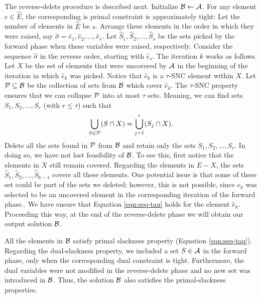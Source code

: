 \documentclass[11pt]{article}
\newcommand{\calA} {{\cal A}}
\newcommand{\calB} {{\cal B}}
\newcommand{\calP} {{\cal P}}
\newcommand{\wh}[1] {\widehat{#1}}
\begin{document}
The reverse-delete procedure is described next.
Initialize $\calB\leftarrow \calA$.
For any element $e\in \wh{E}$, the corresponding is primal constraint is approximately tight:
Let the number of elements in $\wh{E}$ be $s$. Arrange these elements
in the order in which they were raised, say $\wh{\sigma}=\wh{e}_1, \wh{e}_2, \ldots, \wh{e}_s$.
Let $\wh{S}_1, \wh{S}_2, \ldots, \wh{S}_s$ be the sets picked by the forward phase
when these variables were raised, respectively.
Consider the sequence $\wh{\sigma}$ in the reverse order, starting with $\wh{e}_s$.
The iteration $k$ works as follows. 
Let $X$ be the set of elements that were uncovered by $\calA$ in the beginning of the iteration 
in which $\wh{e}_k$ was picked. Notice that $\wh{e}_k$ is a $\tau$-SNC element within $X$.
Let $\calP\subseteq \calB$ be the collection of sets from $\calB$ which cover $\wh{e}_k$. 
The $\tau$-SNC property ensures that we can collapse $\calP$ into at most $\tau$ sets.
Meaning, we can find sets $S_1, S_2, \ldots, S_r$ (with $r\leq \tau$) such that
\[
\bigcup_{S\in \calP} (S\cap X) = \bigcup_{j=1}^r (S_j\cap X).
\]
Delete all the sets found in $\calP$ from $\calB$ and retain only the sets $S_1, S_2, \ldots, S_r$.
In doing so, we have not lost feasibility of $\calB$. To see this, first notice that the elements in $X$ still remain
covered. Regarding the elements in $E-X$, 
the sets $\wh{S}_1, \wh{S}_2, \ldots, \wh{S}_{k-1}$ covers all these elements.
One potential issue is that some of these set could be part of the sets we deleted;
however, this is not possible, since $e_k$ was selected to be an uncovered element in the corresponding iteration
of the forward phase..
We have ensure that Equation \ref{eqn:seq-tau} holds for the element $\wh{e}_k$.
Proceeding this way, at the end of the reverse-delete phase we will obtain our output solution $\calB$.

All the elements in $\calB$ satisfy primal slackness property (Equation \ref{eqn:seq-tau}). 
Regarding the dual-slackness property, we included a set $S\in \calA$ in the forward phase,
only when the corresponding dual constraint is tight. 
Furthermore, the dual variables were not modified in the reverse-delete phase
and no new set was introduced in $\calB$.
Thus, the solution $\calB$ also satisfies the primal-slackness properties.
\end{document}

